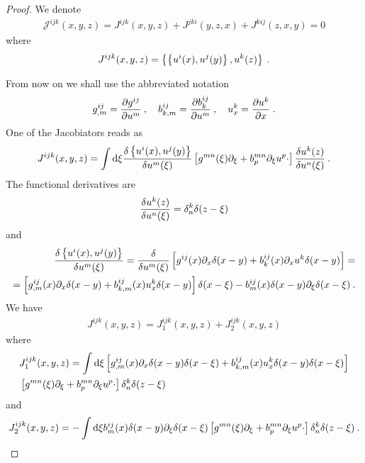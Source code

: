 \begin{proof}
    We denote
    \begin{align}
        \mathcal J^{ijk}(x,y,z) = J^{ijk}(x,y,z)+ J^{jki}(y,z,x)+ J^{kij}(z,x,y) = 0
    \end{align}
    where
    \begin{align}
        J^{ijk}(x,y,z) = \left \lbrace \left \lbrace u^i(x),u^j(y) \right \rbrace, u^k(z) \right \rbrace \:.
    \end{align}

    From now on we shall use the abbreviated notation
    \begin{align}
        g^{ij}_{,m} = \frac{\partial g^{ij}}{\partial u^m} \:, \quad b^{ij}_{k,m} = \frac{\partial b^{ij}_k}{\partial u^m} \:, \quad u^k_x = \frac{\partial u^k}{\partial x}  \:.
    \end{align}
    One of the Jacobiators reads as
    \begin{align*}
        J^{ijk}(x,y,z) =
        \int \mathrm{d} \xi \frac{\delta \left \lbrace u^i(x),u^j(y) \right \rbrace}{\delta u^m(\xi)} 
        \left[ g^{mn}(\xi) \partial_\xi + b^{mn}_p \partial_\xi u^p \cdot \right] \frac{\delta u^k(z)}{\delta u^n(\xi)}  \:.
    \end{align*}
    The functional derivatives are
    \begin{align}
        \frac{\delta u^k(z)}{\delta u^n(\xi)} = \delta^k_n \delta(z-\xi)
    \end{align}
    and 
    \begin{align}
        \frac{\delta \left \lbrace u^i(x),u^j(y) \right \rbrace}{\delta u^m(\xi)} = \frac{\delta }{\delta u^m(\xi)} \left[ g^{ij}(x) \partial_x \delta(x-y) + b^{ij}_k(x) \partial_x u^k \delta(x-y)\right] = 
        \nonumber
        \\ = \left[ g^{ij}_{,m}(x) \partial_x \delta(x-y) + b^{ij}_{k,m}(x) u^k_x \delta(x-y) \right] \delta (x-\xi) - b^{ij}_m(x) \delta(x-y) \partial_\xi \delta(x-\xi) \:.
    \end{align}
    We have
    \begin{align}
        J^{ijk}(x,y,z) = J_1^{ijk}(x,y,z) + J_2^{ijk}(x,y,z) 
    \end{align}
    where
    \begin{align*}
        & J_1^{ijk}(x,y,z) = \int \mathrm{d} \xi  \left[ g^{ij}_{,m}(x) \partial_x \delta(x-y) \delta(x-\xi) + b^{ij}_{k,m}(x) u^k_x \delta(x-y) \delta(x-\xi) \right]   \\ 
        & \left[ g^{mn}(\xi) \partial_\xi + b^{mn}_p \partial_\xi u^p \cdot \right] \delta^k_n \delta(z-\xi)  
    \end{align*}
    and 
    \begin{align*}
        J_2^{ijk}(x,y,z) = - \int \D \xi b^{ij}_m(x) \delta(x-y) \partial_\xi \delta(x-\xi) \left[ g^{mn}(\xi) \partial_\xi + b^{mn}_p \partial_\xi u^p \cdot \right] \delta^k_n \delta(z-\xi)  \:.

\end{align*}
\end{proof}
